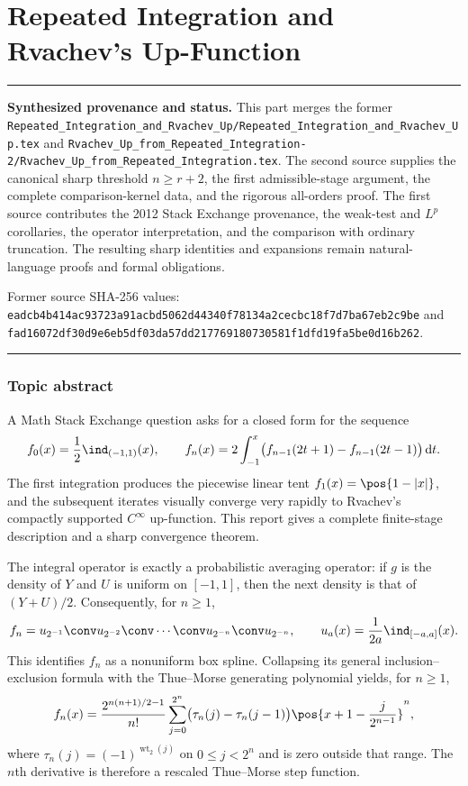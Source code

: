 \documentclass[11pt,oneside]{article}
\theoremstyle{definition}
\theoremstyle{remark}
\newcommand{\wt}{\operatorname{wt}_2}
\newcommand{\dd}{\,\mathrm d}
\newenvironment{boxedremark}{%
  \par\smallskip\noindent\begin{center}\begin{minipage}{0.94\textwidth}%
  \color{black}\hrule\vspace{0.6em}\small
}{%
  \vspace{0.6em}\hrule\end{minipage}\end{center}\smallskip
}
\begin{document}
\part{Repeated Integration and Rvachev's Up-Function}
\label{part:repeated2}
\begin{boxedremark}
\textbf{Synthesized provenance and status.} This part merges the former
\nolinkurl{Repeated_Integration_and_Rvachev_Up/Repeated_Integration_and_Rvachev_Up.tex}
and
\nolinkurl{Rvachev_Up_from_Repeated_Integration-2/Rvachev_Up_from_Repeated_Integration.tex}.
The second source supplies the canonical sharp threshold \(n\ge r+2\), the first
admissible-stage argument, the complete comparison-kernel data, and the rigorous
all-orders proof.  The first source contributes the 2012 Stack Exchange provenance,
the weak-test and \(L^p\) corollaries, the operator interpretation, and the comparison
with ordinary truncation.  The resulting sharp identities and expansions remain
natural-language proofs and formal obligations.\par\smallskip
Former source SHA-256 values:
\nolinkurl{eadcb4b414ac93723a91acbd5062d44340f78134a2cecbc18f7d7ba67eb2c9be} and
\nolinkurl{fad16072df30d9e6eb5df03da57dd217769180730581f1dfd19fa5be0d16b262}.
\end{boxedremark}
\section*{Topic abstract}
A Math Stack Exchange question asks for a closed form for the sequence
\[
 f_0(x)=\frac12\ind_{(-1,1)}(x),\qquad
 f_n(x)=2\int_{-1}^{x}\bigl(f_{n-1}(2t+1)-f_{n-1}(2t-1)\bigr)\dd t.
\]
The first integration produces the piecewise linear tent
$f_1(x)=\pos{1-|x|}$, and the subsequent iterates visually converge very rapidly to
Rvachev's compactly supported $C^\infty$ up-function.  This report gives a complete
finite-stage description and a sharp convergence theorem.

The integral operator is exactly a probabilistic averaging operator: if $g$ is the density
of $Y$ and $U$ is uniform on $[-1,1]$, then the next density is that of $(Y+U)/2$.
Consequently, for $n\ge1$,
\[
 f_n=u_{2^{-1}}\conv u_{2^{-2}}\conv\cdots\conv u_{2^{-n}}\conv u_{2^{-n}},
 \qquad
 u_a(x)=\frac1{2a}\ind_{[-a,a]}(x).
\]
This identifies $f_n$ as a nonuniform box spline.  Collapsing its general
inclusion--exclusion formula with the Thue--Morse generating polynomial yields, for
$n\ge1$,
\[
 f_n(x)=\frac{2^{n(n+1)/2-1}}{n!}
 \sum_{j=0}^{2^n}\bigl(\tau_n(j)-\tau_n(j-1)\bigr)
 \pos{x+1-\frac{j}{2^{n-1}}}^{n},
\]
where $\tau_n(j)=(-1)^{\wt(j)}$ on $0\le j<2^n$ and is zero outside that range.
The $n$th derivative is therefore a rescaled Thue--Morse step function.
\end{document}
